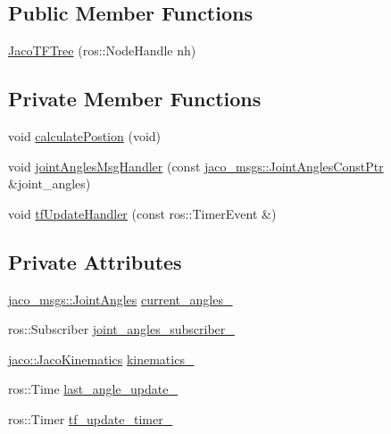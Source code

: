 \subsection*{Public Member Functions}
\begin{DoxyCompactItemize}
\item 
\hyperlink{classjaco_1_1JacoTFTree_aff3a20fea72ff3089968609d7a32ce53}{Jaco\+T\+F\+Tree} (ros\+::\+Node\+Handle nh)
\end{DoxyCompactItemize}
\subsection*{Private Member Functions}
\begin{DoxyCompactItemize}
\item 
void \hyperlink{classjaco_1_1JacoTFTree_a9d27ae1569454f687fdb3efc3c2718cf}{calculate\+Postion} (void)
\item 
void \hyperlink{classjaco_1_1JacoTFTree_ad3cc49dbb3058895d32aa825f386d9d5}{joint\+Angles\+Msg\+Handler} (const \hyperlink{namespacejaco__msgs_a32b25235cc3066080b29ddfde0640ae9}{jaco\+\_\+msgs\+::\+Joint\+Angles\+Const\+Ptr} \&joint\+\_\+angles)
\item 
void \hyperlink{classjaco_1_1JacoTFTree_a6c1129c477dfc9e17cd2185924033ad5}{tf\+Update\+Handler} (const ros\+::\+Timer\+Event \&)
\end{DoxyCompactItemize}
\subsection*{Private Attributes}
\begin{DoxyCompactItemize}
\item 
\hyperlink{namespacejaco__msgs_ae38be3f0cdaac5905b3df022403d6ef4}{jaco\+\_\+msgs\+::\+Joint\+Angles} \hyperlink{classjaco_1_1JacoTFTree_a352b7d128f76d3a4f01e01ec8b416e22}{current\+\_\+angles\+\_\+}
\item 
ros\+::\+Subscriber \hyperlink{classjaco_1_1JacoTFTree_a5908642f0eee94b14d4b4ef649e4ad0f}{joint\+\_\+angles\+\_\+subscriber\+\_\+}
\item 
\hyperlink{classjaco_1_1JacoKinematics}{jaco\+::\+Jaco\+Kinematics} \hyperlink{classjaco_1_1JacoTFTree_aacb83b30f56868891d78852834ef0532}{kinematics\+\_\+}
\item 
ros\+::\+Time \hyperlink{classjaco_1_1JacoTFTree_a20869124ed9dd0b936d79d5d8a60b6db}{last\+\_\+angle\+\_\+update\+\_\+}
\item 
ros\+::\+Timer \hyperlink{classjaco_1_1JacoTFTree_a1470ccde41ff4213c92b4e7ecbcad3e3}{tf\+\_\+update\+\_\+timer\+\_\+}
\end{DoxyCompactItemize}


